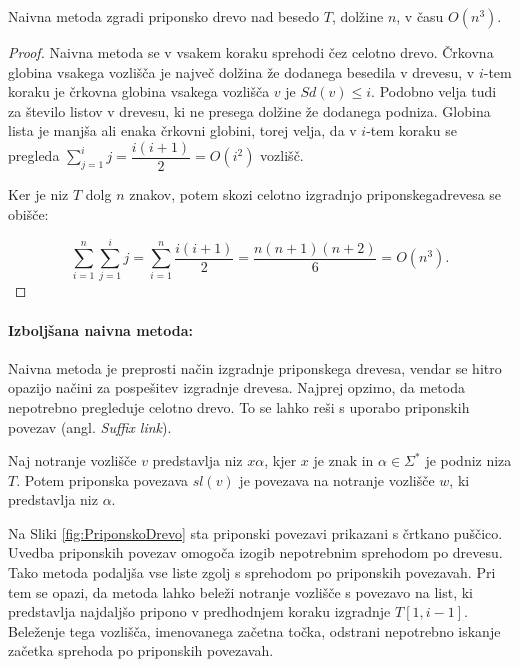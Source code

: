 \begin{izr}\label{izr:naivna}
    Naivna metoda zgradi priponsko drevo nad besedo $T$, dolžine $n$, v času $O(n^3)$.
\end{izr}

\begin{proof}
    Naivna metoda se v vsakem koraku sprehodi čez celotno drevo. Črkovna globina vsakega vozlišča je največ dolžina že dodanega besedila v drevesu, v $i$-tem koraku je črkovna globina vsakega vozlišča $v$ je $\textit{Sd}(v)\le i$. Podobno velja tudi za število listov v drevesu, ki ne presega dolžine že dodanega podniza. Globina lista je manjša ali enaka črkovni globini, torej velja, da v $i$-tem koraku se pregleda $\sum_{j=1}^i j=\dfrac{i(i+1)}{2}=O(i^2)$ vozlišč.

    Ker je niz $T$ dolg $n$ znakov, potem skozi celotno izgradnjo priponskegadrevesa se obišče:

    $$
        \sum_{i=1}^n \sum_{j=1}^i j=\sum_{i=1}^n \dfrac{i(i+1)}{2}=\dfrac{n(n+1)(n+2)}{6}=O(n^3).
    $$
\end{proof}

\paragraph{Izboljšana naivna metoda:}
Naivna metoda je preprosti način izgradnje priponskega drevesa, vendar se hitro opazijo načini za pospešitev izgradnje drevesa. Najprej opzimo, da metoda nepotrebno pregleduje celotno drevo. To se lahko reši s uporabo priponskih povezav (angl. \textit{Suffix link}).

\begin{defi}\label{def:sl}
    Naj notranje vozlišče $v$ predstavlja niz $x\alpha$, kjer $x$ je znak in $\alpha\in\Sigma^*$ je podniz niza $T$. Potem priponska povezava $\textit{sl}(v)$ je povezava na notranje vozlišče $w$, ki predstavlja niz $\alpha$.

\end{defi}

Na Sliki \ref{fig:PriponskoDrevo} sta priponski povezavi prikazani s črtkano puščico. Uvedba priponskih povezav omogoča izogib nepotrebnim sprehodom po drevesu. Tako metoda podaljša vse liste zgolj s sprehodom po priponskih povezavah. Pri tem se opazi, da metoda lahko beleži notranje vozlišče s povezavo na list, ki predstavlja najdaljšo pripono v predhodnjem koraku izgradnje $T[1,i-1]$. Beleženje tega vozlišča, imenovanega začetna točka, odstrani nepotrebno iskanje začetka sprehoda po priponskih povezavah.

